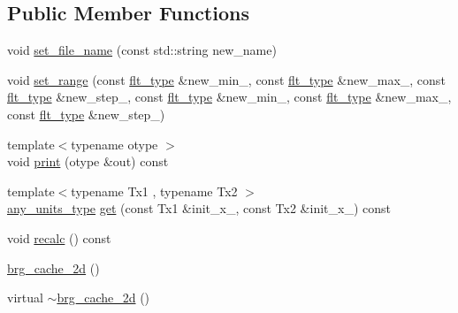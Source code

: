 \subsection*{Public Member Functions}
\begin{DoxyCompactItemize}
\item 
void \hyperlink{classIceBRG_1_1brg__cache__2d_ac0169a69f122655da1fece04a5e12962}{set\+\_\+file\+\_\+name} (const std\+::string new\+\_\+name)
\item 
void \hyperlink{classIceBRG_1_1brg__cache__2d_a3047c524b7a4297b8fff4a3bdeb2afb5}{set\+\_\+range} (const \hyperlink{lib_2IceBRG__main_2common_8h_ad0f130a56eeb944d9ef2692ee881ecc4}{flt\+\_\+type} \&new\+\_\+min\+\_, const \hyperlink{lib_2IceBRG__main_2common_8h_ad0f130a56eeb944d9ef2692ee881ecc4}{flt\+\_\+type} \&new\+\_\+max\+\_, const \hyperlink{lib_2IceBRG__main_2common_8h_ad0f130a56eeb944d9ef2692ee881ecc4}{flt\+\_\+type} \&new\+\_\+step\+\_, const \hyperlink{lib_2IceBRG__main_2common_8h_ad0f130a56eeb944d9ef2692ee881ecc4}{flt\+\_\+type} \&new\+\_\+min\+\_, const \hyperlink{lib_2IceBRG__main_2common_8h_ad0f130a56eeb944d9ef2692ee881ecc4}{flt\+\_\+type} \&new\+\_\+max\+\_, const \hyperlink{lib_2IceBRG__main_2common_8h_ad0f130a56eeb944d9ef2692ee881ecc4}{flt\+\_\+type} \&new\+\_\+step\+\_)
\item 
{\footnotesize template$<$typename otype $>$ }\\void \hyperlink{classIceBRG_1_1brg__cache__2d_ae6da7b6bda41ec9ea2002867951b5349}{print} (otype \&out) const 
\item 
{\footnotesize template$<$typename Tx1 , typename Tx2 $>$ }\\\hyperlink{namespaceIceBRG_a3101fc159e191fa99c4ec14e445df96e}{any\+\_\+units\+\_\+type} \hyperlink{classIceBRG_1_1brg__cache__2d_ab4a16e8ebe873a58b806eb91a3ef9791}{get} (const Tx1 \&init\+\_\+x\+\_, const Tx2 \&init\+\_\+x\+\_) const 
\item 
void \hyperlink{classIceBRG_1_1brg__cache__2d_a36c39cd418b844b64502be417dfef917}{recalc} () const 
\item 
\hyperlink{classIceBRG_1_1brg__cache__2d_a0a129acdbacb34f016c6c50135164348}{brg\+\_\+cache\+\_\+2d} ()
\item 
virtual \hyperlink{classIceBRG_1_1brg__cache__2d_a8e9f954bbe80395793ac2c8c24c2888f}{$\sim$brg\+\_\+cache\+\_\+2d} ()
\end{DoxyCompactItemize}
